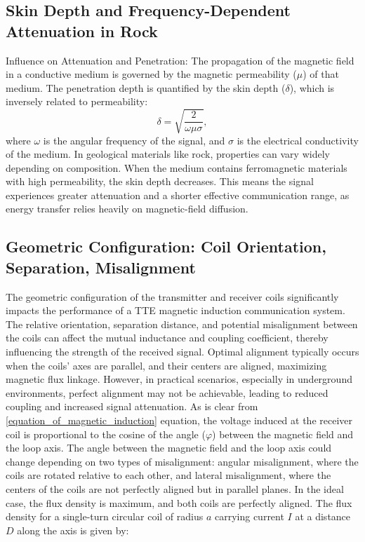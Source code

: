 \subsection{Skin Depth and Frequency-Dependent Attenuation in Rock}\label{subsec:skin-depth}

Influence on Attenuation and Penetration: The propagation of the magnetic field in a conductive medium is governed by the magnetic permeability ($\mu$) of that medium. The penetration depth is quantified by the skin depth ($\delta$), which is inversely related to permeability:
\begin{equation}
    \label{equation_of_skin_depth}
    \delta = \sqrt{\frac{2}{\omega \mu \sigma}} , 
\end{equation}
 \noindent where $\omega$ is the angular frequency of the signal, and $\sigma$ is the electrical conductivity of the medium. In geological materials like rock, properties can vary widely depending on composition. When the medium contains ferromagnetic materials with high permeability, the skin depth decreases. This means the signal experiences greater attenuation and a shorter effective communication range, as energy transfer relies heavily on magnetic-field diffusion.



\subsection{Geometric Configuration: Coil Orientation, Separation, Misalignment}\label{subsec:geometry}

The geometric configuration of the transmitter and receiver coils significantly impacts the performance of a TTE magnetic induction communication system. The relative orientation, separation distance, and potential misalignment between the coils can affect the mutual inductance and coupling coefficient, thereby influencing the strength of the received signal. Optimal alignment typically occurs when the coils' axes are parallel, and their centers are aligned, maximizing magnetic flux linkage. However, in practical scenarios, especially in underground environments, perfect alignment may not be achievable, leading to reduced coupling and increased signal attenuation.
\newp
As is clear from \ref{equation_of_magnetic_induction} equation, the voltage induced at the receiver coil is proportional to the cosine of the angle ($\varphi$) between the magnetic field and the loop axis. The angle between the magnetic field and the loop axis could change depending on two types of misalignment: angular misalignment, where the coils are rotated relative to each other, and lateral misalignment, where the centers of the coils are not perfectly aligned but in parallel planes.
\newp
In the ideal case, the flux density is maximum, and both coils are perfectly aligned. The flux density for a single-turn circular coil of radius $a$ carrying current $I$ at a distance $D$ along the axis is given by:

